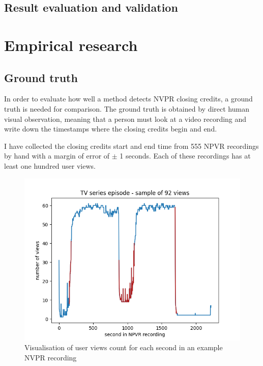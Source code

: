 \subsection{Result evaluation and validation} \label{subsec:validation}







\section{Empirical research} \label{sec:casestudy}

\subsection{Ground truth} \label{subsec:groundtruth}

In order to evaluate how well a method detects NVPR closing credits, a ground truth is needed for comparison. The ground truth is obtained by direct human visual observation, meaning that a person must look at a video recording and write down the timestamps where the closing credits begin and end.

I have collected the closing credits start and end time from 555 NPVR recordings by hand with a margin of error of $\pm$ 1 seconds. Each of these recordings has at least one hundred user views.

\begin{figure}[H]
    \centering
    \includegraphics[width=1\textwidth]{../plots/episode.png}
    \caption{Visualisation of user views count for each second in an example NVPR recording}
    \label{fig:intro_ads_outro}
    \end{figure}

